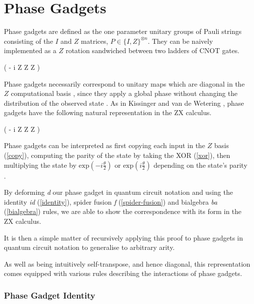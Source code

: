 \section{Phase Gadgets}
Phase gadgets are defined as the one parameter unitary groups of Pauli strings consisting of the $I$ and $Z$ matrices, $P \in \{I, Z\}^{\otimes n}$. They can be naively implemented as a $Z$ rotation sandwiched between two ladders of CNOT gates.

{ \left( - i  Z \otimes Z \otimes Z \right)}

Phase gadgets necessarily correspond to unitary maps which are diagonal in the $Z$ computational basis \cite{Cowtan2020}, since they apply a global phase without changing the distribution of the observed state \cite{Yeung2020}. As in Kissinger and van de Wetering \cite{Kissinger2019}, phase gadgets have the following natural representation in the ZX calculus.

{ \left( - i  Z \otimes Z \otimes Z \right)}

Phase gadgets can be interpreted as first copying each input in the $Z$ basis (\ref{copy}), computing the parity of the state by taking the XOR (\ref{xor}), then multiplying the state by $\text{exp} \left(-i\frac{\theta}{2} \right)$ or $\text{exp} \left(i\frac{\theta}{2} \right)$ depending on the state's parity \cite{Yeung2020}.

By deforming \textit{d} our phase gadget in quantum circuit notation and using the identity \textit{id} (\ref{identity}), spider fusion \textit{f} (\ref{spider-fusion}) and bialgebra \textit{ba} (\ref{bialgebra}) rules, we are able to show the correspondence with its form in the ZX calculus.


It is then a simple matter of recursively applying this proof to phase gadgets in quantum circuit notation to generalise to arbitrary arity.

%
\label{phase-gadget-proof}

As well as being intuitively self-transpose, and hence diagonal, this representation comes equipped with various rules describing the interactions of phase gadgets. 


\subsubsection{Phase Gadget Identity}%
\label{phase-gadget-identity}

